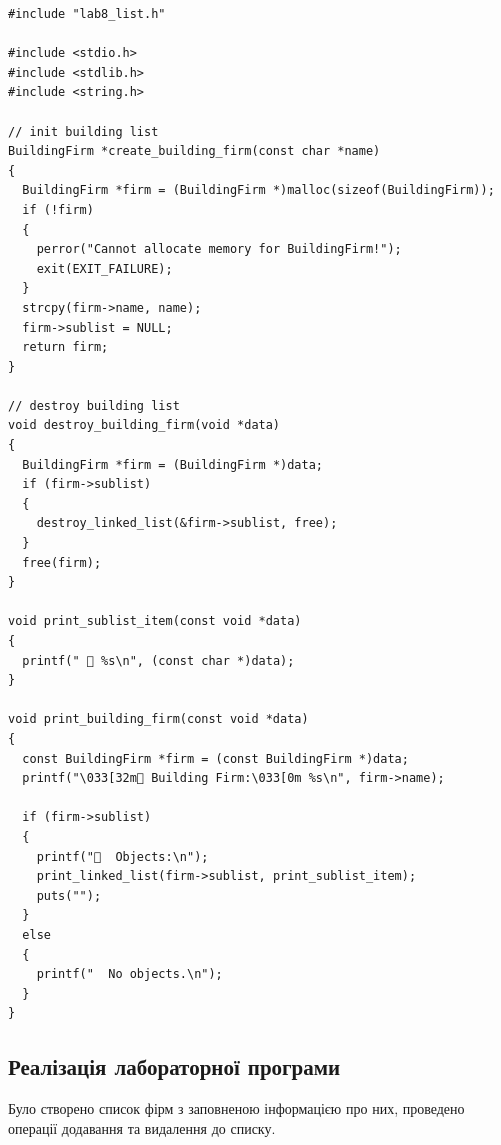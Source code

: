 \begin{lstlisting}[style=customc]
#include "lab8_list.h"

#include <stdio.h>
#include <stdlib.h>
#include <string.h>

// init building list
BuildingFirm *create_building_firm(const char *name)
{
  BuildingFirm *firm = (BuildingFirm *)malloc(sizeof(BuildingFirm));
  if (!firm)
  {
    perror("Cannot allocate memory for BuildingFirm!");
    exit(EXIT_FAILURE);
  }
  strcpy(firm->name, name);
  firm->sublist = NULL;
  return firm;
}

// destroy building list
void destroy_building_firm(void *data)
{
  BuildingFirm *firm = (BuildingFirm *)data;
  if (firm->sublist)
  {
    destroy_linked_list(&firm->sublist, free);
  }
  free(firm);
}

void print_sublist_item(const void *data)
{
  printf("  %s\n", (const char *)data);
}

void print_building_firm(const void *data)
{
  const BuildingFirm *firm = (const BuildingFirm *)data;
  printf("\033[32m Building Firm:\033[0m %s\n", firm->name);

  if (firm->sublist)
  {
    printf("  Objects:\n");
    print_linked_list(firm->sublist, print_sublist_item);
    puts("");
  }
  else
  {
    printf("  No objects.\n");
  }
}
\end{lstlisting}

\clearpage
\subsection{Реалізація лабораторної програми}
Було створено список фірм з заповненою інформацією про них, проведено операції додавання та видалення до списку.

